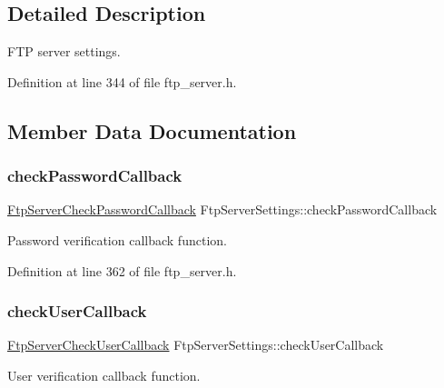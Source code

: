 \subsection{Detailed Description}
F\+TP server settings. 

Definition at line 344 of file ftp\+\_\+server.\+h.



\subsection{Member Data Documentation}
\mbox{\label{structFtpServerSettings_a4a1c5c51668a5618b57fb94247128e57}} 
\subsubsection{\texorpdfstring{check\+Password\+Callback}{checkPasswordCallback}}
{\footnotesize\ttfamily \hyperlink{ftp__server_8h_ac20222f64e4b2b308b2e76ef5d090639}{Ftp\+Server\+Check\+Password\+Callback} Ftp\+Server\+Settings\+::check\+Password\+Callback}



Password verification callback function. 



Definition at line 362 of file ftp\+\_\+server.\+h.

\mbox{\label{structFtpServerSettings_a9fe22a48651c9d7320341da09aa9c08a}} 
\subsubsection{\texorpdfstring{check\+User\+Callback}{checkUserCallback}}
{\footnotesize\ttfamily \hyperlink{ftp__server_8h_adff6dac9b1b8e1a302d97f75d7684791}{Ftp\+Server\+Check\+User\+Callback} Ftp\+Server\+Settings\+::check\+User\+Callback}



User verification callback function. 



